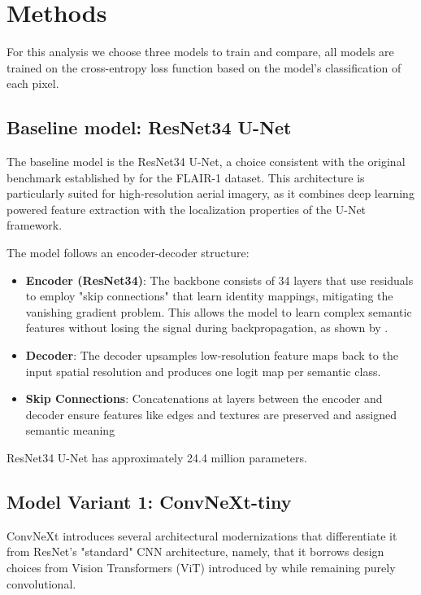 \documentclass{article}
\begin{document}
\section{Methods}
For this analysis we choose three models to train and compare, all models are trained on the cross-entropy loss function based on the model's classification of each pixel.

\subsection{Baseline model: ResNet34 U-Net}

The baseline model is the ResNet34 U-Net, a choice consistent with the original benchmark established by \cite{ign2022flair1} for the  FLAIR-1 dataset. This architecture is particularly suited for high-resolution aerial imagery, as it combines deep learning powered feature extraction with the localization properties of the U-Net framework.

The model follows an encoder-decoder structure:
\begin{itemize}
    \item \textbf{Encoder (ResNet34)}: The backbone consists of 34 layers that use residuals to employ "skip connections" that learn identity mappings, mitigating the vanishing gradient problem. This allows the model to learn complex semantic features without losing the signal during backpropagation, as shown by \cite{he2016resnet}.
    \item \textbf{Decoder}: The decoder upsamples low-resolution feature maps back to the input spatial resolution and produces one logit map per semantic class.
    \item \textbf{Skip Connections}: Concatenations at layers between the encoder and decoder ensure features like edges and textures are preserved and assigned semantic meaning
\end{itemize}

ResNet34 U-Net has approximately 24.4 million parameters.

\subsection{Model Variant 1: ConvNeXt-tiny}
ConvNeXt \cite{liu2022convnet} introduces several architectural modernizations that differentiate it from ResNet's "standard" CNN architecture, namely, that it borrows design choices from Vision Transformers (ViT) introduced by \cite{DBLP:journals/corr/abs-2010-11929} while remaining purely convolutional.
\end{document}
